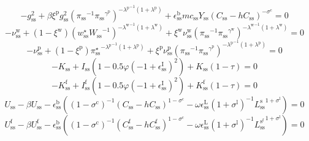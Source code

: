 \begin{equation}
-g^{\mathrm{2}}_\mathrm{ss} + {\beta} {\xi^{\mathrm{p}}} {g^{\mathrm{2}}_\mathrm{ss}} {\left({\pi_\mathrm{ss}}^{-1} {{\pi_\mathrm{ss}}^{\gamma^{\mathrm{p}}}}\right)^{-{\lambda^{\mathrm{p}}}^{-1} \left(1 + \lambda^{\mathrm{p}}\right)}} + {\epsilon^{\mathrm{b}}_\mathrm{ss}} {{m\!c}_\mathrm{ss}} {Y_\mathrm{ss}} {\left(C_\mathrm{ss} - {h} {C_\mathrm{ss}}\right)^{-\sigma^{\mathrm{c}}}} = 0
\end{equation}
\begin{equation}
-\nu^{\mathrm{w}}_\mathrm{ss} + \left(1 - \xi^{\mathrm{w}}\right) {\left({w^{\star}_\mathrm{ss}} {W_\mathrm{ss}}^{-1}\right)^{-{\lambda^{\mathrm{w}}}^{-1} \left(1 + \lambda^{\mathrm{w}}\right)}} + {\xi^{\mathrm{w}}} {\nu^{\mathrm{w}}_\mathrm{ss}} {\left({\pi_\mathrm{ss}}^{-1} {{\pi_\mathrm{ss}}^{\gamma^{\mathrm{w}}}}\right)^{-{\lambda^{\mathrm{w}}}^{-1} \left(1 + \lambda^{\mathrm{w}}\right)}} = 0
\end{equation}
\begin{equation}
-\nu^{\mathrm{p}}_\mathrm{ss} + \left(1 - \xi^{\mathrm{p}}\right) {{\pi^{\star}_\mathrm{ss}}^{-{\lambda^{\mathrm{p}}}^{-1} \left(1 + \lambda^{\mathrm{p}}\right)}} + {\xi^{\mathrm{p}}} {\nu^{\mathrm{p}}_\mathrm{ss}} {\left({\pi_\mathrm{ss}}^{-1} {{\pi_\mathrm{ss}}^{\gamma^{\mathrm{p}}}}\right)^{-{\lambda^{\mathrm{p}}}^{-1} \left(1 + \lambda^{\mathrm{p}}\right)}} = 0
\end{equation}
\begin{equation}
-K_\mathrm{ss} + {I_\mathrm{ss}} \left(1 - 0.5{\varphi} \left(-1 + \epsilon^{\mathrm{I}}_\mathrm{ss}\right)^{2}\right) + {K_\mathrm{ss}} \left(1 - \tau\right) = 0
\end{equation}
\begin{equation}
-K^{\mathrm{f}}_\mathrm{ss} + {I^{\mathrm{f}}_\mathrm{ss}} \left(1 - 0.5{\varphi} \left(-1 + \epsilon^{\mathrm{I}}_\mathrm{ss}\right)^{2}\right) + {K^{\mathrm{f}}_\mathrm{ss}} \left(1 - \tau\right) = 0
\end{equation}
\begin{equation}
U_\mathrm{ss} - {\beta} {U_\mathrm{ss}} - {\epsilon^{\mathrm{b}}_\mathrm{ss}} \left(\left(1 - \sigma^{\mathrm{c}}\right)^{-1} {\left(C_\mathrm{ss} - {h} {C_\mathrm{ss}}\right)^{1 - \sigma^{\mathrm{c}}}} - {\omega} {\epsilon^{\mathrm{L}}_\mathrm{ss}} \left(1 + \sigma^{\mathrm{l}}\right)^{-1} {{L^{\mathrm{s}}_\mathrm{ss}}^{1 + \sigma^{\mathrm{l}}}}\right) = 0
\end{equation}
\begin{equation}
U^{\mathrm{f}}_\mathrm{ss} - {\beta} {U^{\mathrm{f}}_\mathrm{ss}} - {\epsilon^{\mathrm{b}}_\mathrm{ss}} \left(\left(1 - \sigma^{\mathrm{c}}\right)^{-1} {\left(C^{\mathrm{f}}_\mathrm{ss} - {h} {C^{\mathrm{f}}_\mathrm{ss}}\right)^{1 - \sigma^{\mathrm{c}}}} - {\omega} {\epsilon^{\mathrm{L}}_\mathrm{ss}} \left(1 + \sigma^{\mathrm{l}}\right)^{-1} {{L^{\mathrm{s}^{\mathrm{f}}}_\mathrm{ss}}^{1 + \sigma^{\mathrm{l}}}}\right) = 0
\end{equation}
